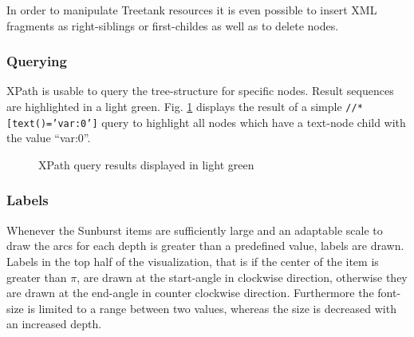 \begin{itemize}
In order to manipulate Treetank resources it is even possible to insert XML fragments as right-siblings or first-childes as well as to delete nodes.

\subsubsection{Querying}
XPath is usable to query the tree-structure for specific nodes. Result sequences are highlighted in a light green. Fig. \ref{fig:sunburstxpath} displays the result of a simple \texttt{//*[text()='var:0']} query to highlight all nodes which have a text-node child with the value ``var:0''.

\begin{figure}[tb]
\caption{\label{fig:sunburstxpath} XPath query results displayed in light green}
\end{figure}

\subsubsection{Labels}
Whenever the Sunburst items are sufficiently large and an adaptable scale to draw the arcs for each depth is greater than a predefined value, labels are drawn. Labels in the top half of the visualization, that is if the center of the item is greater than $\pi$, are drawn at the start-angle in clockwise direction, otherwise they are drawn at the end-angle in counter clockwise direction. Furthermore the font-size is limited to a range between two values, whereas the size is decreased with an increased depth. 


\end{itemize}
